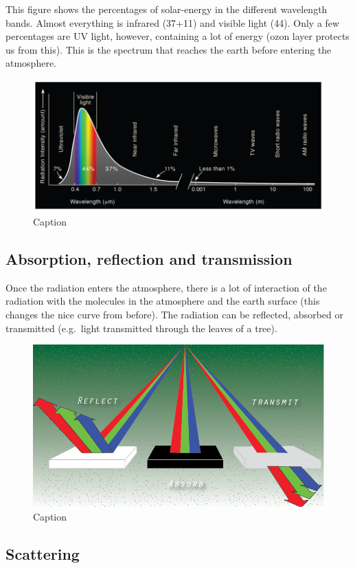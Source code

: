 \documentclass[oneside]{book}
\begin{document}
This figure shows the percentages of solar-energy in the different
wavelength bands. Almost everything is infrared (37+11) and visible
light (44). Only a few percentages are UV light, however, containing a
lot of energy (ozon layer protects us from this). This is the spectrum
that reaches the earth before entering the atmosphere.

\begin{figure}

{\centering \includegraphics[width=0.5\linewidth]{figures/Figure122} 

}

\caption{Caption}\label{fig:Spectrum}
\end{figure}

\subsection{Absorption, reflection and
transmission}\label{absorption-reflection-and-transmission}

Once the radiation enters the atmosphere, there is a lot of interaction
of the radiation with the molecules in the atmosphere and the earth
surface (this changes the nice curve from before). The radiation can be
reflected, absorbed or transmitted (e.g.~light transmitted through the
leaves of a tree).

\begin{figure}

{\centering \includegraphics[width=0.5\linewidth]{figures/Figure123} 

}

\caption{Caption}\label{fig:Spectrum2}
\end{figure}

\subsection{Scattering}\label{scattering}
\end{document}
